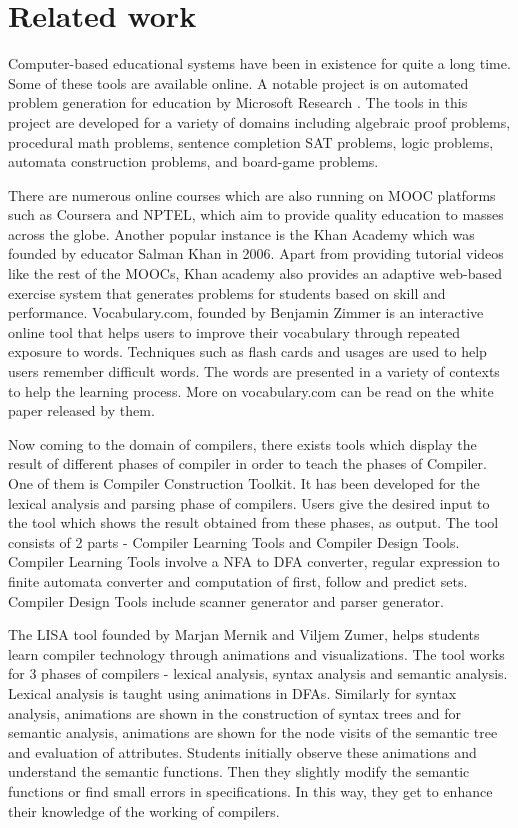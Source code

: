 \chapter{Related work}
\label{chap:related}

Computer-based educational systems have been in existence for quite a long time. Some of these tools are available online. A notable project is on automated problem generation for education by Microsoft Research \cite{msrprobgen}. The tools in this project are developed for a variety of domains including algebraic proof problems, procedural math problems, sentence completion SAT problems, logic problems, automata construction problems, and board-game problems. 

There are numerous online courses which are also running on MOOC\cite{wiki:mooc} platforms such as Coursera\cite{coursera} and NPTEL\cite{nptel}, which aim to provide quality education to masses across the globe. Another popular instance is the Khan Academy\cite{khanacademy} which was founded by educator Salman Khan in 2006. Apart from providing tutorial videos like the rest of the MOOCs, Khan academy also provides an adaptive web-based exercise system that generates problems for students based on skill and performance\cite{wiki:khanacademy}. Vocabulary.com\cite{vocabulary}, founded by Benjamin Zimmer is an interactive online tool that helps users to improve their vocabulary through repeated exposure to words. Techniques such as flash cards and usages are used to help users remember difficult words. The words are presented in a variety of contexts to help the learning process. More on vocabulary.com can be read on the white paper released by them\cite{vocabwhite}.

Now coming to the domain of compilers, there exists tools which display the result of different phases of compiler in order to teach the phases of Compiler. One of them is Compiler Construction Toolkit\cite{cct}. It has been developed for the lexical analysis and parsing phase of compilers. Users give the desired input to the tool which shows the result obtained from these phases, as output. The tool consists of 2 parts - Compiler Learning Tools and Compiler Design Tools. Compiler Learning Tools involve a NFA to DFA converter, regular expression to finite automata converter and computation of first, follow and predict sets. Compiler Design Tools include scanner generator and parser generator.

The LISA tool \cite{mernik2003educational} founded by Marjan Mernik and Viljem Zumer, helps students learn compiler technology through animations and visualizations. The tool works for 3 phases of compilers - lexical analysis, syntax analysis and semantic analysis. Lexical analysis is taught using animations in DFAs. Similarly for syntax analysis, animations are shown in the construction of syntax trees and for semantic analysis, animations are shown for the node visits of the semantic tree and evaluation of attributes. Students initially observe these animations and understand the semantic functions. Then they slightly modify the semantic functions or find small errors in specifications. In this way, they get to enhance their knowledge of the working of compilers.
